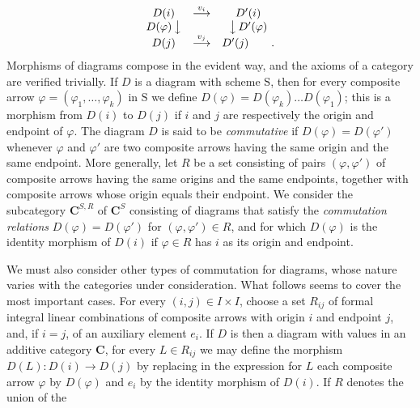 \[
\begin{array}{ccc}
D(i) & \stackrel{v_i}{\longrightarrow} & D'(i) \\
{D(\varphi)}\,\big\downarrow &&
  \big\downarrow\,{D'(\varphi)} \\
D(j) & \stackrel{v_j}{\longrightarrow} & D'(j)\qquad .
\end{array}
\]
Morphisms of diagrams compose in the evident way, and the axioms of a
category are verified trivially.
If $D$ is a diagram with scheme $\mathrm{S}$, then for every composite arrow
$\varphi=(\varphi_1,\ldots,\varphi_k)$ in $\mathrm{S}$ we define
$D(\varphi)=D(\varphi_k)\ldots D(\varphi_1)$; this is a morphism from $D(i)$
to $D(j)$ if $i$ and $j$ are respectively the origin and endpoint of
$\varphi$. The diagram $D$ is said to be \textit{commutative} if
$D(\varphi)=D(\varphi')$ whenever $\varphi$ and $\varphi'$ are two composite
arrows having the same origin and the same endpoint.
More generally, let $R$ be a set consisting of pairs $(\varphi,\varphi')$ of
composite arrows having the same origins and the same endpoints, together
with composite arrows whose origin equals their endpoint. We consider the
subcategory $\mathbf{C}^{S,R}$ of $\mathbf{C}^S$ consisting of diagrams that satisfy the
\textit{commutation relations} $D(\varphi)=D(\varphi')$ for
$(\varphi,\varphi')\in R$, and for which $D(\varphi)$ is the identity morphism
of $D(i)$ if $\varphi\in R$ has $i$ as its origin and endpoint.

We must also consider other types of commutation for diagrams, whose nature
varies with the categories under consideration. What follows seems to cover
the most important cases. For every $(i,j)\in I\times I$, choose a set
$R_{ij}$ of formal integral linear combinations of composite arrows with
origin $i$ and endpoint $j$, and, if $i=j$, of an auxiliary element $e_i$.
If $D$ is then a diagram with values in an additive category $\mathbf{C}$, for every
$L\in R_{ij}$ we may define the morphism
$D(L):D(i)\to D(j)$ by replacing in the expression for $L$ each
composite arrow $\varphi$ by $D(\varphi)$ and $e_i$ by the identity morphism
of $D(i)$. If $R$ denotes the union of the

